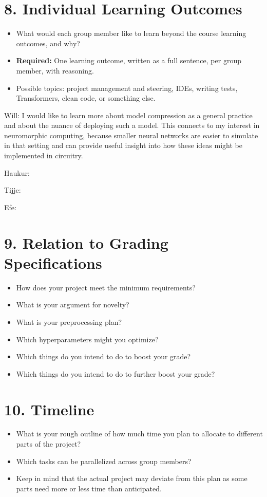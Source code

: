 \documentclass[11pt]{article}
\begin{document}
\section{8. Individual Learning Outcomes}
\begin{itemize}
    \item What would each group member like to learn beyond the course learning outcomes, and why?
    \item \textbf{Required:} One learning outcome, written as a full sentence, per group member, with reasoning.
    \item Possible topics: project management and steering, IDEs, writing tests, Transformers, clean code, or something else.
\end{itemize}

Will: I would like to learn more about model compression as a general practice and about the nuance of deploying such a model. This connects to my interest in neuromorphic computing, because smaller neural networks are easier to simulate in that setting and can provide useful insight into how these ideas might be implemented in circuitry.


Haukur:


Tijje:


Efe:


\section{9. Relation to Grading Specifications}
\begin{itemize}
    \item How does your project meet the minimum requirements?
    \item What is your argument for novelty?
    \item What is your preprocessing plan?
    \item Which hyperparameters might you optimize?
    \item Which things do you intend to do to boost your grade?
    \item Which things do you intend to do to further boost your grade?
\end{itemize}



\section{10. Timeline}
\begin{itemize}
    \item What is your rough outline of how much time you plan to allocate to different parts of the project?
    \item Which tasks can be parallelized across group members?
    \item Keep in mind that the actual project may deviate from this plan as some parts need more or less time than anticipated.
\end{itemize}
\end{document}
